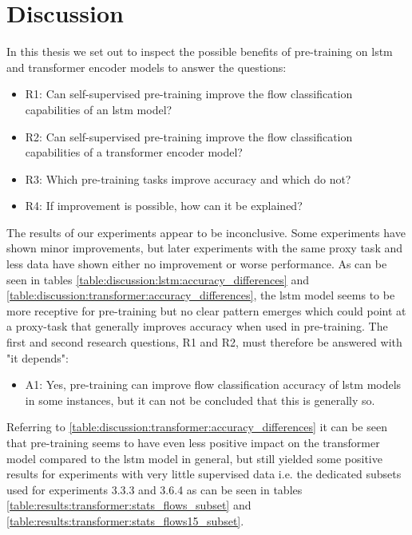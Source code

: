 \chapter{Discussion} \label{sec:discussion}

In this thesis we set out to inspect the possible benefits of pre-training on \gls{lstm} and transformer encoder models to answer the questions:

\begin{itemize}
	\item R1: Can self-supervised pre-training improve the flow classification capabilities of an \gls{lstm} model?
	\item R2: Can self-supervised pre-training improve the flow classification capabilities of a transformer encoder model?
	\item R3: Which pre-training tasks improve accuracy and which do not?
	\item R4: If improvement is possible, how can it be explained?
\end{itemize}

The results of our experiments appear to be inconclusive. Some experiments have shown minor improvements, but later experiments with the same proxy task and less data have shown either no improvement or worse performance. As can be seen in tables \ref{table:discussion:lstm:accuracy_differences} and \ref{table:discussion:transformer:accuracy_differences}, the \gls{lstm} model seems to be more receptive for pre-training but no clear pattern emerges which could point at a proxy-task that generally improves accuracy when used in pre-training. The first and second research questions, R1 and R2, must therefore be answered with "it depends":

\begin{itemize}
	\item A1: Yes, pre-training can improve flow classification accuracy of \gls{lstm} models in some instances, but it can not be concluded that this is generally so.
\end{itemize}

Referring to \ref{table:discussion:transformer:accuracy_differences} it can be seen that pre-training seems to have even less positive impact on the transformer model compared to the \gls{lstm} model in general, but still yielded some positive results for experiments with very little supervised data i.e. the dedicated subsets used for experiments 3.3.3 and 3.6.4 as can be seen in tables \ref{table:results:transformer:stats_flows_subset} and \ref{table:results:transformer:stats_flows15_subset}.

